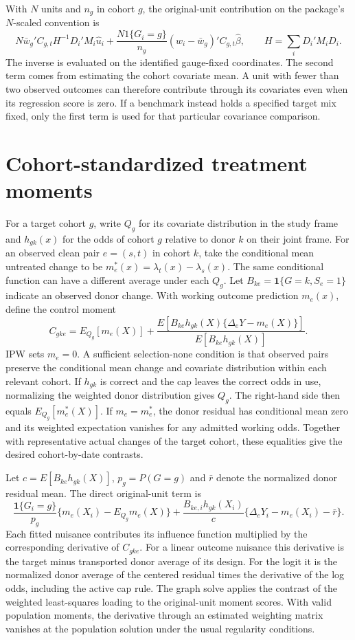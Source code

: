 \documentclass[11pt]{article}
\begin{document}
With \(N\) units and \(n_g\) in cohort \(g\), the original-unit contribution
on the package's \(N\)-scaled convention is
\[
  N\bar w_g' C_{g,t} H^{-1} D_i'M_i\widehat u_i
  +
  \frac{N 1\{G_i=g\}}{n_g}
  (w_i-\bar w_g)' C_{g,t}\widehat\beta ,
\qquad H=\sum_i D_i'M_iD_i .
\]
The inverse is evaluated on the identified gauge-fixed coordinates. The
second term comes from estimating the cohort covariate mean. A unit with
fewer than two observed outcomes can therefore contribute through its
covariates even when its regression score is zero. If a benchmark instead
holds a specified target mix fixed, only the first term is used for that
particular covariance comparison.

\section{Cohort-standardized treatment moments}
For a target cohort \(g\), write \(Q_g\) for its covariate distribution in the
study frame and \(h_{gk}(x)\) for the odds of cohort \(g\) relative to donor
\(k\) on their joint frame. For an observed clean pair \(e=(s,t)\) in cohort
\(k\), take the conditional mean untreated change to be
\(m_e^*(x)=\lambda_t(x)-\lambda_s(x)\). The same conditional function can
have a different average under each \(Q_g\).
Let \(B_{ke}=\mathbf{1}\{G=k,S_e=1\}\) indicate an observed donor change.
With working outcome prediction \(m_e(x)\), define the control moment
\[
 C_{gke}=E_{Q_g}[m_e(X)] +
   \frac{E[B_{ke} h_{gk}(X)\{\Delta_eY-m_e(X)\}]}{E[B_{ke}h_{gk}(X)]}.
\]
IPW sets \(m_e=0\). A sufficient selection-none condition is that
observed pairs preserve the conditional mean change and covariate
distribution within each relevant cohort. If \(h_{gk}\) is correct
and the cap leaves the correct odds in use, normalizing the weighted
donor distribution gives \(Q_g\). The
right-hand side then equals \(E_{Q_g}[m_e^*(X)]\). If \(m_e=m_e^*\),
the donor residual has conditional mean zero and its weighted expectation
vanishes for any admitted working odds. Together with representative
actual changes of the target cohort, these equalities give the desired
cohort-by-date contrasts.

Let \(c=E[B_{ke}h_{gk}(X)]\), \(p_g=P(G=g)\) and \(\bar r\) denote
the normalized donor residual mean. The direct original-unit term is
\[
 \frac{\mathbf{1}\{G_i=g\}}{p_g}\{m_e(X_i)-E_{Q_g}m_e(X)\}+
 \frac{B_{ke,i}h_{gk}(X_i)}{c}\{\Delta_eY_i-m_e(X_i)-\bar r\}.
\]
Each fitted nuisance contributes its influence function multiplied by
the corresponding derivative of \(C_{gke}\). For a linear outcome
nuisance this derivative is the target minus transported donor average
of its design. For the logit it is the normalized donor average of the
centered residual times the derivative of the log odds, including the
active cap rule. The graph solve applies the contrast of the weighted
least-squares loading to the original-unit moment scores. With valid
population moments, the derivative through an estimated weighting
matrix vanishes at the population solution under the usual regularity
conditions.
\end{document}
